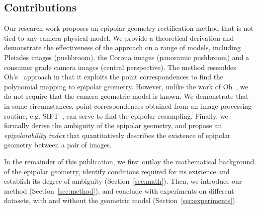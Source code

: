 \documentclass{ipol}
\begin{document}
 


 


\subsection{Contributions}
Our research work proposes an epipolar geometry rectification method that is not tied to any camera physical model. %
We provide a theoretical derivation and demonstrate the effectiveness of the approach on a range of models, including Pleiades images (pushbroom), the Corona images (panoramic pushbroom) and a consumer grade camera images (central perspective).
The method resembles Oh's~\cite{Oh2011} approach in that it exploits the point correspondences to find the polynomial mapping to epipolar geometry. However, unlike the work of Oh~\cite{Oh2011}, we do not require that the camera geometric model is known. We demonstrate that in some circumstances, point correspondences obtained from an image processing routine, e.g. SIFT~\cite{lowe2004distinctive}, can serve to find the epipolar resampling. 
Finally, we formally derive the ambiguity of the epipolar geometry, and propose an \textit{epipolarability index} that quantitatively describes the existence of epipolar geometry between a pair of images.

In the remainder of this publication, we first outlay the mathematical background of the epipolar geometry{, identify conditions required for its existence and establish its degree of ambiguity}  (Section~\ref{sec:math}). Then, we introduce our method (Section~\ref{sec:method}), and conclude with experiments on different datasets, with and without the geometric model (Section~\ref{sec:experiments}). 
 
\end{document}
